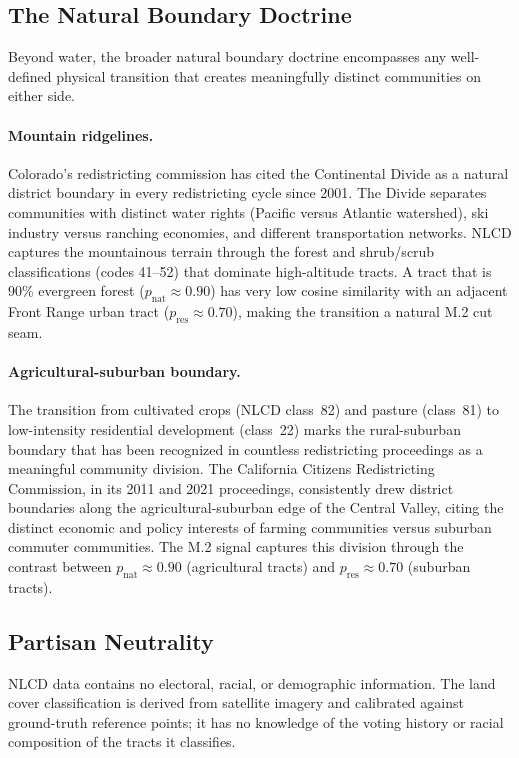 \subsection{The Natural Boundary Doctrine}

Beyond water, the broader natural boundary doctrine encompasses any
well-defined physical transition that creates meaningfully distinct
communities on either side.

\paragraph{Mountain ridgelines.}
Colorado's redistricting commission has cited the Continental Divide as a
natural district boundary in every redistricting cycle since 2001.
The Divide separates communities with distinct water rights (Pacific versus
Atlantic watershed), ski industry versus ranching economies, and different
transportation networks.
NLCD captures the mountainous terrain through the forest and shrub/scrub
classifications (codes 41--52) that dominate high-altitude tracts.
A tract that is 90\% evergreen forest ($p_{\mathrm{nat}} \approx 0.90$) has
very low cosine similarity with an adjacent Front Range urban tract
($p_{\mathrm{res}} \approx 0.70$), making the transition a natural
M.2 cut seam.

\paragraph{Agricultural-suburban boundary.}
The transition from cultivated crops (NLCD class~82) and pasture (class~81)
to low-intensity residential development (class~22) marks the rural-suburban
boundary that has been recognized in countless redistricting proceedings as
a meaningful community division.
The California Citizens Redistricting Commission, in its 2011 and 2021
proceedings, consistently drew district boundaries along the
agricultural-suburban edge of the Central Valley, citing the distinct
economic and policy interests of farming communities versus suburban commuter
communities.
The M.2 signal captures this division through the contrast between
$p_{\mathrm{nat}} \approx 0.90$ (agricultural tracts) and
$p_{\mathrm{res}} \approx 0.70$ (suburban tracts).

\subsection{Partisan Neutrality}

NLCD data contains no electoral, racial, or demographic information.
The land cover classification is derived from satellite imagery and
calibrated against ground-truth reference points; it has no knowledge
of the voting history or racial composition of the tracts it classifies.

